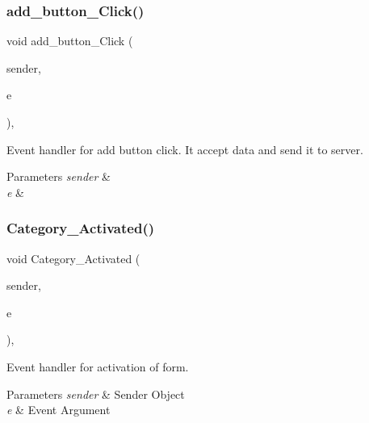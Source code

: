 \subsubsection{\texorpdfstring{add\+\_\+button\+\_\+\+Click()}{add\_button\_Click()}}
{\footnotesize\ttfamily void add\+\_\+button\+\_\+\+Click (\begin{DoxyParamCaption}\item[{object}]{sender,  }\item[{Event\+Args}]{e }\end{DoxyParamCaption})\hspace{0.3cm}{\ttfamily [inline]}, {\ttfamily [private]}}



Event handler for add button click. It accept data and send it to server. 


\begin{DoxyParams}{Parameters}
{\em sender} & \\
\hline
{\em e} & \\
\hline
\end{DoxyParams}
\mbox{\label{classWildlifeTrackingApp_1_1Category_ad88debab69dc59b9a3bc2bdd89b1e4f9}} 
\subsubsection{\texorpdfstring{Category\+\_\+\+Activated()}{Category\_Activated()}}
{\footnotesize\ttfamily void Category\+\_\+\+Activated (\begin{DoxyParamCaption}\item[{object}]{sender,  }\item[{Event\+Args}]{e }\end{DoxyParamCaption})\hspace{0.3cm}{\ttfamily [inline]}, {\ttfamily [private]}}



Event handler for activation of form. 


\begin{DoxyParams}{Parameters}
{\em sender} & Sender Object\\
\hline
{\em e} & Event Argument\\
\hline
\end{DoxyParams}
\mbox{\label{classWildlifeTrackingApp_1_1Category_af87e0d54e9971bfe9ccba3a85841f619}} 
